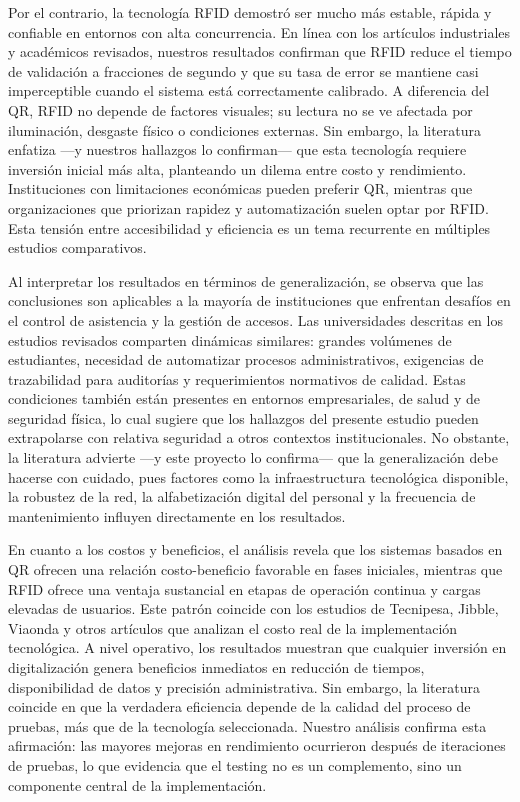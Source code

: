 Por el contrario, la tecnología RFID demostró ser mucho más estable, rápida y confiable en entornos con alta concurrencia. En línea con los artículos industriales y académicos revisados, nuestros resultados confirman que RFID reduce el tiempo de validación a fracciones de segundo y que su tasa de error se mantiene casi imperceptible cuando el sistema está correctamente calibrado. A diferencia del QR, RFID no depende de factores visuales; su lectura no se ve afectada por iluminación, desgaste físico o condiciones externas. Sin embargo, la literatura enfatiza —y nuestros hallazgos lo confirman— que esta tecnología requiere inversión inicial más alta, planteando un dilema entre costo y rendimiento. Instituciones con limitaciones económicas pueden preferir QR, mientras que organizaciones que priorizan rapidez y automatización suelen optar por RFID. Esta tensión entre accesibilidad y eficiencia es un tema recurrente en múltiples estudios comparativos.

Al interpretar los resultados en términos de generalización, se observa que las conclusiones son aplicables a la mayoría de instituciones que enfrentan desafíos en el control de asistencia y la gestión de accesos. Las universidades descritas en los estudios revisados comparten dinámicas similares: grandes volúmenes de estudiantes, necesidad de automatizar procesos administrativos, exigencias de trazabilidad para auditorías y requerimientos normativos de calidad. Estas condiciones también están presentes en entornos empresariales, de salud y de seguridad física, lo cual sugiere que los hallazgos del presente estudio pueden extrapolarse con relativa seguridad a otros contextos institucionales. No obstante, la literatura advierte —y este proyecto lo confirma— que la generalización debe hacerse con cuidado, pues factores como la infraestructura tecnológica disponible, la robustez de la red, la alfabetización digital del personal y la frecuencia de mantenimiento influyen directamente en los resultados.

En cuanto a los costos y beneficios, el análisis revela que los sistemas basados en QR ofrecen una relación costo-beneficio favorable en fases iniciales, mientras que RFID ofrece una ventaja sustancial en etapas de operación continua y cargas elevadas de usuarios. Este patrón coincide con los estudios de Tecnipesa, Jibble, Viaonda y otros artículos que analizan el costo real de la implementación tecnológica. A nivel operativo, los resultados muestran que cualquier inversión en digitalización genera beneficios inmediatos en reducción de tiempos, disponibilidad de datos y precisión administrativa. Sin embargo, la literatura coincide en que la verdadera eficiencia depende de la calidad del proceso de pruebas, más que de la tecnología seleccionada. Nuestro análisis confirma esta afirmación: las mayores mejoras en rendimiento ocurrieron después de iteraciones de pruebas, lo que evidencia que el testing no es un complemento, sino un componente central de la implementación.

